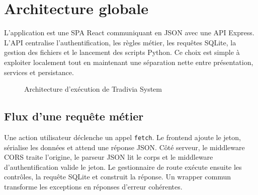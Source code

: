 \documentclass[12pt,a4paper,oneside]{report}
\newcommand{\code}[1]{\texttt{#1}}
\begin{document}
\section{Architecture globale}
L'application est une SPA React communiquant en JSON avec une API Express. L'API centralise l'authentification, les règles métier, les requêtes SQLite, la gestion des fichiers et le lancement des scripts Python. Ce choix est simple à exploiter localement tout en maintenant une séparation nette entre présentation, services et persistance.

\begin{figure}[H]\centering
{}
\caption{Architecture d'exécution de Tradivia System}
\end{figure}

\subsection{Flux d'une requête métier}
Une action utilisateur déclenche un appel \code{fetch}. Le frontend ajoute le jeton, sérialise les données et attend une réponse JSON. Côté serveur, le middleware CORS traite l'origine, le parseur JSON lit le corps et le middleware d'authentification valide le jeton. Le gestionnaire de route exécute ensuite les contrôles, la requête SQLite et construit la réponse. Un wrapper commun transforme les exceptions en réponses d'erreur cohérentes.
\end{document}
